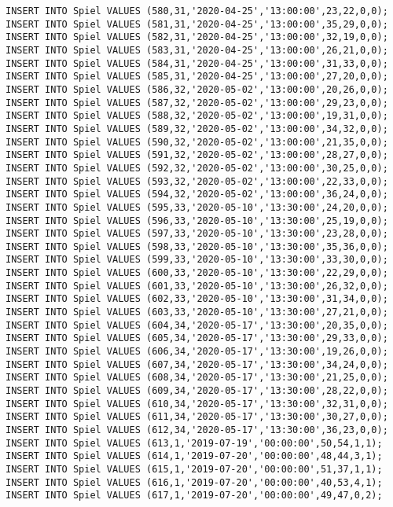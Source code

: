 \documentclass{bschlangaul-aufgabe}
\begin{document}
\begin{verbatim}
INSERT INTO Spiel VALUES (580,31,'2020-04-25','13:00:00',23,22,0,0);
INSERT INTO Spiel VALUES (581,31,'2020-04-25','13:00:00',35,29,0,0);
INSERT INTO Spiel VALUES (582,31,'2020-04-25','13:00:00',32,19,0,0);
INSERT INTO Spiel VALUES (583,31,'2020-04-25','13:00:00',26,21,0,0);
INSERT INTO Spiel VALUES (584,31,'2020-04-25','13:00:00',31,33,0,0);
INSERT INTO Spiel VALUES (585,31,'2020-04-25','13:00:00',27,20,0,0);
INSERT INTO Spiel VALUES (586,32,'2020-05-02','13:00:00',20,26,0,0);
INSERT INTO Spiel VALUES (587,32,'2020-05-02','13:00:00',29,23,0,0);
INSERT INTO Spiel VALUES (588,32,'2020-05-02','13:00:00',19,31,0,0);
INSERT INTO Spiel VALUES (589,32,'2020-05-02','13:00:00',34,32,0,0);
INSERT INTO Spiel VALUES (590,32,'2020-05-02','13:00:00',21,35,0,0);
INSERT INTO Spiel VALUES (591,32,'2020-05-02','13:00:00',28,27,0,0);
INSERT INTO Spiel VALUES (592,32,'2020-05-02','13:00:00',30,25,0,0);
INSERT INTO Spiel VALUES (593,32,'2020-05-02','13:00:00',22,33,0,0);
INSERT INTO Spiel VALUES (594,32,'2020-05-02','13:00:00',36,24,0,0);
INSERT INTO Spiel VALUES (595,33,'2020-05-10','13:30:00',24,20,0,0);
INSERT INTO Spiel VALUES (596,33,'2020-05-10','13:30:00',25,19,0,0);
INSERT INTO Spiel VALUES (597,33,'2020-05-10','13:30:00',23,28,0,0);
INSERT INTO Spiel VALUES (598,33,'2020-05-10','13:30:00',35,36,0,0);
INSERT INTO Spiel VALUES (599,33,'2020-05-10','13:30:00',33,30,0,0);
INSERT INTO Spiel VALUES (600,33,'2020-05-10','13:30:00',22,29,0,0);
INSERT INTO Spiel VALUES (601,33,'2020-05-10','13:30:00',26,32,0,0);
INSERT INTO Spiel VALUES (602,33,'2020-05-10','13:30:00',31,34,0,0);
INSERT INTO Spiel VALUES (603,33,'2020-05-10','13:30:00',27,21,0,0);
INSERT INTO Spiel VALUES (604,34,'2020-05-17','13:30:00',20,35,0,0);
INSERT INTO Spiel VALUES (605,34,'2020-05-17','13:30:00',29,33,0,0);
INSERT INTO Spiel VALUES (606,34,'2020-05-17','13:30:00',19,26,0,0);
INSERT INTO Spiel VALUES (607,34,'2020-05-17','13:30:00',34,24,0,0);
INSERT INTO Spiel VALUES (608,34,'2020-05-17','13:30:00',21,25,0,0);
INSERT INTO Spiel VALUES (609,34,'2020-05-17','13:30:00',28,22,0,0);
INSERT INTO Spiel VALUES (610,34,'2020-05-17','13:30:00',32,31,0,0);
INSERT INTO Spiel VALUES (611,34,'2020-05-17','13:30:00',30,27,0,0);
INSERT INTO Spiel VALUES (612,34,'2020-05-17','13:30:00',36,23,0,0);
INSERT INTO Spiel VALUES (613,1,'2019-07-19','00:00:00',50,54,1,1);
INSERT INTO Spiel VALUES (614,1,'2019-07-20','00:00:00',48,44,3,1);
INSERT INTO Spiel VALUES (615,1,'2019-07-20','00:00:00',51,37,1,1);
INSERT INTO Spiel VALUES (616,1,'2019-07-20','00:00:00',40,53,4,1);
INSERT INTO Spiel VALUES (617,1,'2019-07-20','00:00:00',49,47,0,2);

\end{verbatim}
\end{document}
